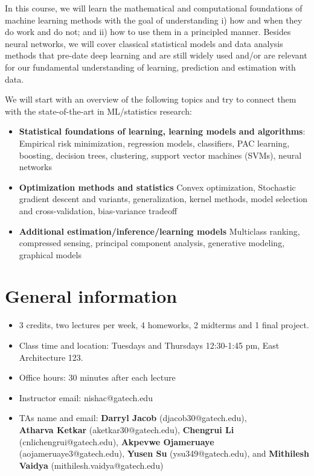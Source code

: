 \documentclass[12pt]{article}
\begin{document}
\MakeScribeTop

In this course, we will learn the mathematical and computational foundations of machine learning methods with the goal of understanding i) how and when they do work and do not; and ii) how to use them in a principled manner. Besides neural networks, we will cover classical statistical models and data analysis methods that pre-date deep learning and are still widely used and/or are relevant for our fundamental understanding of learning, prediction and estimation with data.

We will start with an overview of the following topics and try to connect them with the state-of-the-art in ML/statistics research:
\begin{itemize}
	\item \textbf{Statistical foundations of learning, learning models and algorithms}: Empirical risk minimization, regression models, classifiers, PAC learning, boosting, decision trees, clustering, support vector machines (SVMs), neural networks 
	\item \textbf{Optimization methods and statistics} Convex optimization, Stochastic gradient descent and variants, generalization, kernel methods, model selection and cross-validation, bias-variance tradeoff
	\item \textbf{Additional estimation/inference/learning models} Multiclass ranking, compressed sensing, principal component analysis, generative modeling, graphical models
\end{itemize}
\section{General information}
\begin{itemize}
	\item 3 credits, two lectures per week, 4 homeworks, 2 midterms and 1 final project.
	\item Class time and location: Tuesdays and Thursdays 12:30-1:45 pm, East Architecture 123.
	\item Office hours: 30 minutes after each lecture
	\item Instructor email: nishac@gatech.edu
	\item TAs name and email: \textbf{Darryl Jacob} (djacob30@gatech.edu), 
		\\ \textbf{Atharva Ketkar} (aketkar30@gatech.edu),
		\textbf{Chengrui Li} (cnlichengrui@gatech.edu), 
		\textbf{Akpevwe Ojameruaye} (aojameruaye3@gatech.edu), 
		\textbf{Yusen Su} (ysu349@gatech.edu), 
		and \textbf{Mithilesh Vaidya} (mithilesh.vaidya@gatech.edu) 
\end{itemize}
\end{document}
